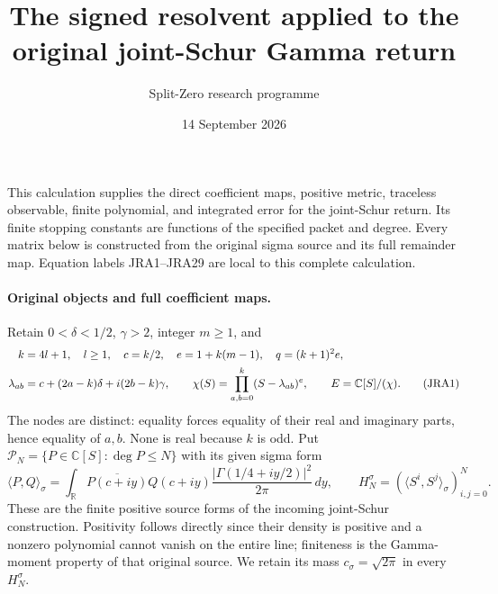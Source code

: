 \documentclass[11pt,a4paper]{article}
\title{The signed resolvent applied to the original joint-Schur Gamma return}
\author{Split-Zero research programme}
\date{14 September 2026}
\newcommand{\C}{\mathbb C}
\newcommand{\R}{\mathbb R}
\begin{document}
\maketitle

This calculation supplies the direct coefficient maps, positive metric,
traceless observable, finite polynomial, and integrated error for the
joint-Schur return. Its finite stopping constants are functions of the
specified packet and degree. Every matrix below is constructed from the
original sigma source and its full remainder map. Equation labels JRA1--JRA29
are local to this complete calculation.

\paragraph{Original objects and full coefficient maps.}
Retain $0<\delta<1/2$, $\gamma>2$, integer $m\geq1$, and
\begin{align}
 k&=4l+1,\quad l\geq1,\quad c=k/2,\quad e=1+k(m-1),\quad q=(k+1)^2e,\notag\\
 \lambda_{ab}&=c+(2a-k)\delta+i(2b-k)\gamma,\qquad
 \chi(S)=\prod_{a,b=0}^k(S-\lambda_{ab})^e,\qquad
 E=\C[S]/(\chi).\tag{JRA1}
\end{align}
The nodes are distinct: equality forces equality of their real and imaginary
parts, hence equality of $a,b$. None is real because $k$ is odd.
Put $\mathcal P_N=\{P\in\C[S]:\deg P\leq N\}$ with its given sigma form
\begin{equation}
 \langle P,Q\rangle_\sigma=\int_\R
 \overline{P(c+iy)}Q(c+iy)
 \frac{|\Gamma(1/4+iy/2)|^2}{2\pi}\,dy,
 \qquad H_N^\sigma=(\langle S^i,S^j\rangle_\sigma)_{i,j=0}^N.
 \tag{JRA2}
\end{equation}
These are the finite positive source forms of the incoming joint-Schur
construction. Positivity follows directly since their density is positive
and a nonzero polynomial cannot vanish on the entire line; finiteness is
the Gamma-moment property of that original source. We retain its mass
$c_\sigma=\sqrt{2\pi}$ in every $H_N^\sigma$.
\end{document}
